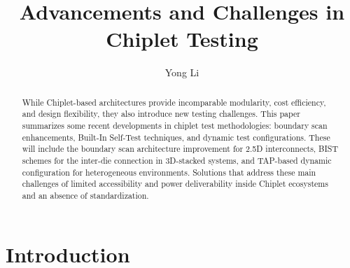 \documentclass[acmtog, 12pt]{acmart}
\begin{document}
\title{Advancements and Challenges in Chiplet Testing}

\author{Yong Li}



\begin{abstract}
  While Chiplet-based architectures provide incomparable modularity, cost efficiency, and design flexibility, they also introduce new testing challenges. This paper summarizes some recent developments in chiplet test methodologies: boundary scan enhancements, Built-In Self-Test techniques, and dynamic test configurations. These will include the boundary scan architecture improvement for 2.5D interconnects, BIST schemes for the inter-die connection in 3D-stacked systems, and TAP-based dynamic configuration for heterogeneous environments. Solutions that address these main challenges of limited accessibility and power deliverability inside Chiplet ecosystems and an absence of standardization.
  \end{abstract}
  
    
    
\maketitle


\section*{Introduction}



\end{document}
